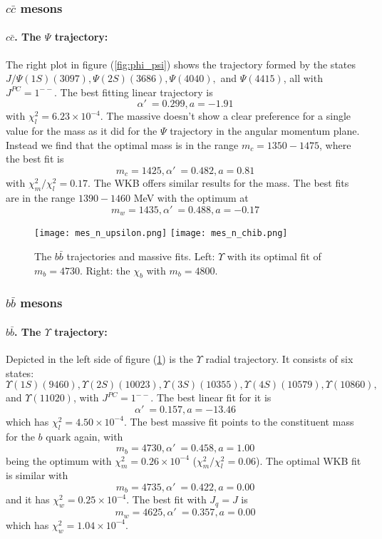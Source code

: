 \documentclass[11pt,a4]{article}
\newcommand{\alp}{\ensuremath{\alpha'\:}}
\newcommand{\ccb}{c\bar{c}}
\newcommand{\bbb}{b\bar{b}}
\newcommand{\rchi}[1]{\ensuremath{\chi^2_m/\chi^2_l = #1}}
\newcommand{\ten}[1]{\times10^{#1}}
\begin{document}
			\subsubsection{\texorpdfstring{$\ccb$}{c-cbar} mesons}
				\paragraph{\(\ccb\). The \(\Psi\) trajectory:} The right plot in figure (\ref{fig:phi_psi}) shows the trajectory formed by the states	\(J/\Psi(1S)(3097), \Psi(2S)(3686), \Psi(4040),\) and \(\Psi(4415)\), all with \(J^{PC} = 1^{--}\). The best fitting linear trajectory is
				\[\alp = 0.299, a = -1.91\]
				with \(\chi^2_l = 6.23\ten{-4}\). The massive doesn't show a clear preference for a single value for the mass as it did for the \(\Psi\) trajectory in the angular momentum plane. Instead we find that the optimal mass is in the range \(m_c = 1350-1475\), where the best fit is
				\[ m_c = 1425, \alp = 0.482, a = 0.81 \]
				with \rchi{0.17}. The WKB offers similar results for the mass. The best fits are in the range \(1390-1460\) MeV with the optimum at
				\[ m_w = 1435, \alp = 0.488, a = -0.17 \]
				
				\begin{figure}[tbp] \centering
						\texttt{[image: mes\_n\_upsilon.png]}	 \hfill
						\texttt{[image: mes\_n\_chib.png]}
						\caption{\label{fig:ups_chib} The \(\bbb\) trajectories and massive fits. Left: \(\Upsilon\) with its optimal fit of \(m_b = 4730\). Right: the \(\chi_b\) with \(m_b = 4800\).}
				\end{figure}

			\subsubsection{\texorpdfstring{$\bbb$}{b-bbar} mesons}

				\paragraph{\(\bbb\). The \(\Upsilon\) trajectory:} Depicted in the left side of figure (\ref{fig:ups_chib}) is the \(\Upsilon\) radial trajectory. It consists of six states: \(\Upsilon(1S)(9460), \Upsilon(2S)(10023), \Upsilon(3S)(10355) ,\Upsilon(4S)(10579), \Upsilon(10860),\) and \(\Upsilon(11020)\), with \(J^{PC} = 1^{--}\). The best linear fit for it is
				\[ \alp = 0.157, a = -13.46 \]
				which has \(\chi^2_l = 4.50\ten{-4}\). The best massive fit points to the constituent mass for the \(b\) quark again, with
				\[ m_b = 4730, \alp = 0.458, a = 1.00 \]
				being the optimum with \(\chi^2_m = 0.26\ten{-4}\) (\rchi{0.06}). The optimal WKB fit is similar with
				\[ m_b = 4735, \alp = 0.422, a = 0.00 \]
				and it has \(\chi^2_w = 0.25\ten{-4}\). The best fit with \(J_q = J\) is
				\[ m_w = 4625, \alp = 0.357, a = 0.00 \]
				which has \(\chi^2_w = 1.04\ten{-4}\).				
				
\end{document}
